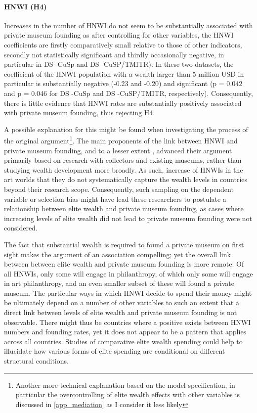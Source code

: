 \documentclass[11pt]{article}
\begin{document}
\paragraph*{HNWI (H4)}


Increases in the number of HNWI do not seem to be substantially associated with private museum founding as after controlling for other variables, the HNWI coefficients are firstly comparatively small relative to those of other indicators, secondly not statistically significant and thirdly occasionally negative, in particular in DS -CuSp and DS -CuSP/TMITR).
In these two datasets, the coefficient of the HNWI population with a wealth larger than 5 million USD in particular is substantially negative (-0.23 and -0.20) and significant (p = 0.042 and p = 0.046 for DS -CuSp and DS -CuSP/TMITR, respectively).
Consequently, there is little evidence that HNWI rates are substantially positively associated with private museum founding, thus rejecting H4.


A possible explanation for this might be found when investigating the process of the original argument\footnote{Another more technical explanation based on the model specification, in particular the overcontrolling of elite wealth effects with other variables is discussed in \ref{app_mediation} as I consider it less likely}.
The main proponents of the link between HNWI and private museum founding, \textcite[,]{Gnyp_2015_collectors}\textcite{Zorloni_Resch_2016_opportunities} and to a lesser extent \textcite{Walker_2019_collector}, advanced their argument primarily based on research with collectors and existing museums, rather than studying wealth development more broadly.
As such, increase of HNWIs in the art worlds that they do not systematically capture the wealth levels in countries beyond their research scope.  
Consequently, such sampling on the dependent variable or selection bias might have lead these researchers to postulate a relationship between elite wealth and private museum founding, as cases where increasing levels of elite wealth did not lead to private museum founding were not considered. 


The fact that substantial wealth is required to found a private museum on first sight makes the argument of an association compelling; yet the overall link between between elite wealth and private museum founding is more remote: 
Of all HNWIs, only some will engage in philanthropy, of which only some will engage in art philanthropy, and  an even smaller subset of these will found a private museum.
The particular ways in which HNWI decide to spend their money might be ultimately depend on a number of other variables to such an extent that a direct link between levels of elite wealth and private museum founding is not observable.
There might thus be countries where a positive exists between HNWI numbers and founding rates, yet it does not appear to be a pattern that applies across all countries. 
Studies of comparative elite wealth spending could help to illucidate how various forms of elite spending are conditional on different structural conditions.
\end{document}
